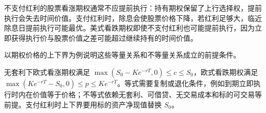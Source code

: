 \begin{solution}
不支付红利的股票看涨期权通常不应提前执行：持有期权保留了上行选择权，提前执行会失去时间价值。支付红利时，除息会使股票价格下降，若红利足够大，临近除息日提前执行可能最优。美式看跌期权即使不支付红利也可能提前执行，因为立即获得执行价与股票价值之差可能超过继续持有的时间价值。
\end{solution}
\begin{problem}
 以期权价格的上下界为例说明这些等量关系和不等量关系成立的前提条件。
\end{problem}
\begin{solution}
无套利下欧式看涨期权满足 $\max(S_0-Ke^{-rT},0)\le c\le S_0$，欧式看跌期权满足 $\max(Ke^{-rT}-S_0,0)\le p\le Ke^{-rT}$。等式需要复制或退化条件，例如到期立即执行时内在价值等于价格；不等式依赖无套利、可借贷、无交易成本和标的可交易等前提。支付红利时上下界要用标的资产净现值替换 $S_0$。
\end{solution}

